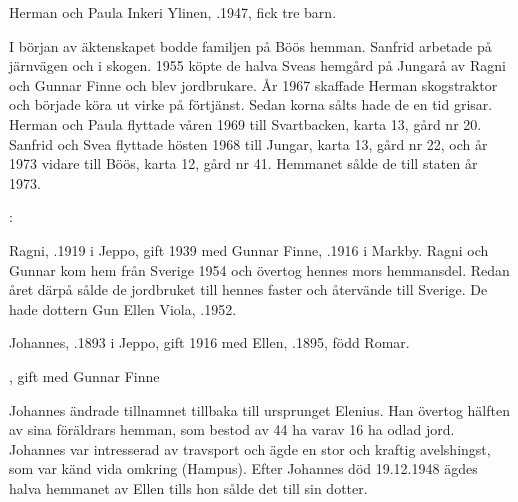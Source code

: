 Herman och Paula Inkeri Ylinen, .1947, fick tre barn.
\begin{jhchildren}
  \item {}
  \item {}
  \item {}
\end{jhchildren}

I början av äktenskapet bodde familjen på Böös hemman. Sanfrid arbetade på järnvägen och i skogen. 1955 köpte de halva Sveas hemgård på Jungarå av Ragni och Gunnar Finne och blev jordbrukare. År 1967 skaffade Herman skogstraktor och började köra ut virke på förtjänst. Sedan korna sålts hade de en tid grisar. Herman och 	Paula flyttade våren 1969 till Svartbacken, karta 13, gård nr 20. Sanfrid och Svea flyttade hösten 1968 till Jungar, karta 13, gård nr 22, och år 1973 vidare till Böös, karta 12, gård nr 41. Hemmanet sålde de till staten år 1973.


%
:

Ragni, .1919 i Jeppo, gift 1939 med Gunnar Finne, .1916 i Markby. Ragni och Gunnar kom hem från Sverige 1954 och övertog hennes mors hemmansdel. Redan året därpå sålde de jordbruket till hennes faster och återvände till Sverige. De hade dottern Gun Ellen Viola, .1952.


%
Johannes, .1893 i Jeppo, gift 1916 med Ellen, .1895, född Romar.
\begin{jhchildren}
  \item {}
  \item {}, gift med Gunnar Finne
\end{jhchildren}
Johannes ändrade tillnamnet tillbaka till ursprunget Elenius. Han övertog hälften av sina föräldrars hemman, som bestod av 44 ha varav 16 ha odlad jord. Johannes var intresserad av travsport och ägde en stor och kraftig avelshingst, som var känd vida omkring (Hampus). Efter Johannes död 19.12.1948 ägdes halva hemmanet av Ellen tills hon sålde det till sin dotter.


